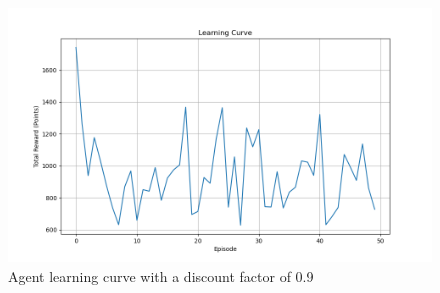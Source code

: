 \begin{figure}[h]
    \centering
    \includegraphics[width=1.0\textwidth]{figs/learning_curve_0.9.png}
    \vskip 0.2in
    \caption{Agent learning curve with a discount factor of 0.9}
    \label{fig:learning_curve_0.9}
\end{figure}
